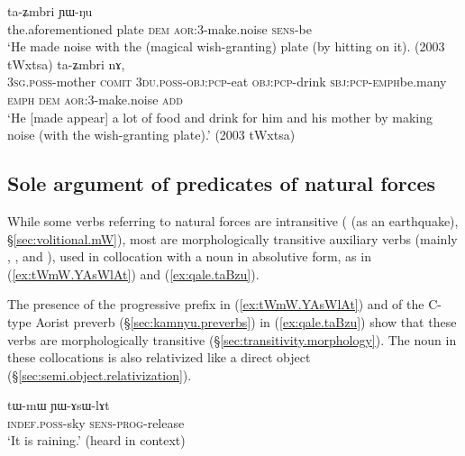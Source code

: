 \begin{exe}
\ex 
\begin{xlist}
\ex \label{ex:taZmbri}
  ta-ʑmbri ɲɯ-ŋu \\
 the.aforementioned plate \textsc{dem} \textsc{aor}:3\flobv{}-make.noise \textsc{sens}-be \\
\glt `He made noise with the (magical wish-granting) plate (by hitting on it). (2003 tWxtsa)
\ex \label{ex:taZmbri2}
  ta-ʑmbri nɤ, \\
 \textsc{3sg}.\textsc{poss}-mother \textsc{comit} \textsc{3du}.\textsc{poss}-\textsc{obj}:\textsc{pcp}-eat \textsc{obj}:\textsc{pcp}-drink \textsc{sbj}:\textsc{pcp}-\textsc{emph}\redp{}be.many \textsc{emph} \textsc{dem} \textsc{aor}:3\flobv{}-make.noise \textsc{add} \\
\glt `He [made appear] a lot of food and drink for him and his mother by making noise (with the wish-granting plate).' (2003 tWxtsa)
\end{xlist}
\end{exe}

\subsection{Sole argument of predicates of natural forces} \label{sec:absolutive.nature}
  
While some verbs referring to natural forces are intransitive ( (as an earthquake), §\ref{sec:volitional.mW}), most are morphologically transitive auxiliary verbs (mainly , ,  and ), used in collocation with a noun in absolutive form, as in (\ref{ex:tWmW.YAsWlAt}) and (\ref{ex:qale.taBzu}).

The presence of the progressive  prefix in (\ref{ex:tWmW.YAsWlAt}) and of the C-type Aorist  preverb (§\ref{sec:kamnyu.preverbs}) in (\ref{ex:qale.taBzu}) show that these verbs are morphologically transitive (§\ref{sec:transitivity.morphology}). The noun in these collocations is also relativized like a direct object (§\ref{sec:semi.object.relativization}).
 
\begin{exe}
\ex \label{ex:tWmW.YAsWlAt}
 \gll tɯ-mɯ ɲɯ-ɤsɯ-lɤt \\
 \textsc{indef}.\textsc{poss}-sky \textsc{sens}-\textsc{prog}-release \\
 \glt `It is raining.' (heard in context)
\end{exe}

